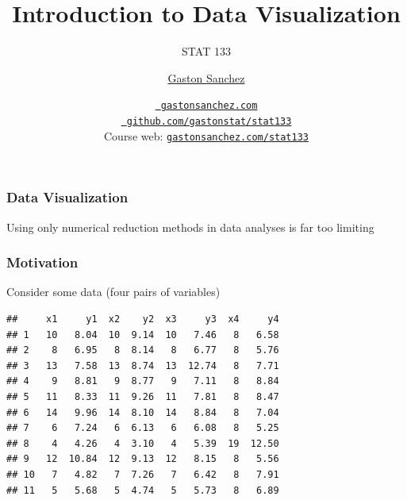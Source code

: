 \documentclass[12pt]{beamer}\usepackage[]{graphicx}\usepackage[]{color}
\title{Introduction to Data Visualization}
\subtitle{STAT 133}
\author{\href{http://www.gastonsanchez.com}{Gaston Sanchez}}
\institute{Department of Statistics, UC{\textendash}Berkeley}
\date{\href{http://www.gastonsanchez.com}{\tt \scriptsize \color{foreground} gastonsanchez.com}
\\[-4pt]
\href{http://github.com/gastonstat/stat133}{\tt \scriptsize \color{foreground} github.com/gastonstat/stat133}
\\[-4pt]
{\scriptsize Course web: \href{http://www.gastonsanchez.com/stat133}{\tt gastonsanchez.com/stat133}}
}
\makeatletter
\newenvironment{kframe}{%
 \def\at@end@of@kframe{}%
 \ifinner\ifhmode%
  \def\at@end@of@kframe{\end{minipage}}%
  \begin{minipage}{\columnwidth}%
 \fi\fi%
 \def\FrameCommand##1{\hskip\@totalleftmargin \hskip-\fboxsep
 \colorbox{shadecolor}{##1}\hskip-\fboxsep
     \hskip-\linewidth \hskip-\@totalleftmargin \hskip\columnwidth}%
 \MakeFramed {\advance\hsize-\width
   \@totalleftmargin\z@ \linewidth\hsize
   \@setminipage}}%
 {\par\unskip\endMakeFramed%
 \at@end@of@kframe}
\newenvironment{knitrout}{}{} %
\makeatother
\begin{document}
{
  \frame{
    \titlepage
  } 
}


\begin{frame}
\begin{center}
\Huge{}
\end{center}
\end{frame}


\begin{frame}
\frametitle{Data Visualization}

Using only numerical reduction methods in data analyses is far too limiting

\end{frame}


\begin{frame}[fragile]
\frametitle{Motivation}

Consider some data (four pairs of variables)
\begin{knitrout}\footnotesize
{}\color{fgcolor}\begin{kframe}
\begin{verbatim}
##     x1     y1  x2    y2  x3     y3  x4     y4
## 1   10   8.04  10  9.14  10   7.46   8   6.58
## 2    8   6.95   8  8.14   8   6.77   8   5.76
## 3   13   7.58  13  8.74  13  12.74   8   7.71
## 4    9   8.81   9  8.77   9   7.11   8   8.84
## 5   11   8.33  11  9.26  11   7.81   8   8.47
## 6   14   9.96  14  8.10  14   8.84   8   7.04
## 7    6   7.24   6  6.13   6   6.08   8   5.25
## 8    4   4.26   4  3.10   4   5.39  19  12.50
## 9   12  10.84  12  9.13  12   8.15   8   5.56
## 10   7   4.82   7  7.26   7   6.42   8   7.91
## 11   5   5.68   5  4.74   5   5.73   8   6.89
\end{verbatim}
\end{kframe}
\end{knitrout}

\end{frame}


\begin{frame}
\begin{center}
\large{}
\end{center}
\end{frame}
\end{document}

